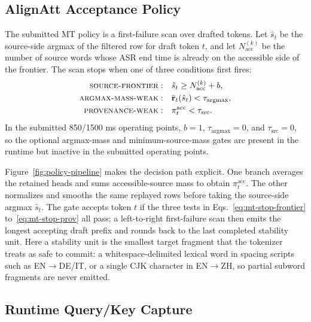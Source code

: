 \documentclass[11pt]{article}
\begin{document}
\subsection{AlignAtt Acceptance Policy}

The submitted MT policy is a first-failure scan over drafted tokens. Let
$\hat{s}_t$ be the source-side argmax of the filtered row for draft token $t$,
and let $N^{(k)}_{\mathrm{acc}}$ be the number of source words whose ASR end
time is already on the accessible side of the frontier. The scan stops when one
of three conditions first fires:
\begin{align}
  \text{\textsc{source-frontier}} :\quad
  &\hat{s}_t \ge N^{(k)}_{\mathrm{acc}} + b,
  \label{eq:mt-stop-frontier}\\
  \text{\textsc{argmax-mass-weak}} :\quad
  &\bar{\mathbf{r}}_t(\hat{s}_t) < \tau_{\mathrm{argmax}},
  \label{eq:mt-stop-argmax}\\
  \text{\textsc{provenance-weak}} :\quad
  &\pi_t^{\mathrm{acc}} < \tau_{\mathrm{src}}.
  \label{eq:mt-stop-prov}
\end{align}
In the submitted 850/1500 ms operating points, $b=1$,
$\tau_{\mathrm{argmax}}=0$, and $\tau_{\mathrm{src}}=0$, so the optional
argmax-mass and minimum-source-mass gates are present in the runtime but
inactive in the submitted operating points.



Figure~\ref{fig:policy-pipeline} makes the decision path explicit. One branch
averages the retained heads and sums accessible-source mass to obtain
$\pi_t^{\mathrm{acc}}$. The other normalizes and smooths the same replayed rows
before taking the source-side argmax $\hat{s}_t$. The gate accepts token $t$
if the three tests in
Eqs.~\eqref{eq:mt-stop-frontier} to~\eqref{eq:mt-stop-prov} all pass; a
left-to-right first-failure scan then emits the longest accepting draft prefix
and rounds back to the last completed stability unit. Here a stability unit is
the smallest target fragment that the tokenizer treats as safe to commit: a
whitespace-delimited lexical word in spacing scripts such as EN$\to$DE/IT, or
a single CJK character in EN$\to$ZH, so partial subword fragments are never
emitted.

\subsection{Runtime Query/Key Capture}
\end{document}
